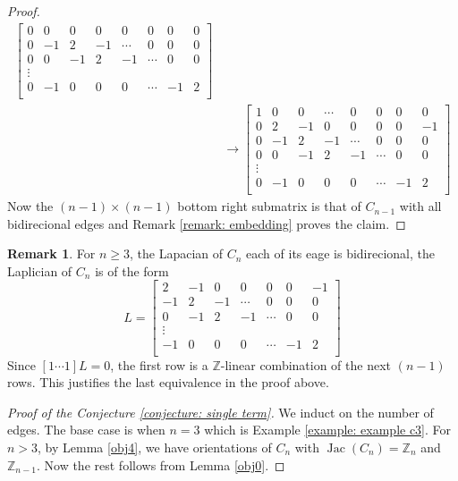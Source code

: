 \documentclass[11pt,reqno]{amsart}
\DeclareMathOperator{\Jac}{Jac}
\newcommand{\Z}{\mathbb{Z}}
\theoremstyle{definition}
\newtheorem{rmk}[mydef]{Remark}
\theoremstyle{plain}
\begin{document}
\begin{proof}
\begin{align*}
\begin{bmatrix}
				0 & 0 & 0 & 0 & 0 & 0 & 0 & 0   \\
				0 & -1 & 2 & -1 & \cdots & 0 & 0 & 0 \\
				0 & 0 & -1 & 2 & -1 & \cdots & 0 & 0  \\
				\vdots \\
				0 & -1 & 0 & 0 & 0 & \cdots & -1 & 2 \\
			\end{bmatrix}\\
			&\to\begin{bmatrix}
				1 & 0 & 0 & \cdots & 0 & 0 & 0 & 0 \\
				0 & 2 & -1 & 0 & 0 & 0 & 0 & -1   \\
				0 & -1 & 2 & -1 & \cdots & 0 & 0 & 0 \\
				0 & 0 & -1 & 2 & -1 & \cdots & 0 & 0  \\
				\vdots \\
				0 & -1 & 0 & 0 & 0 & \cdots & -1 & 2 \\
			\end{bmatrix} \tag{See the remark below for the last equivalance}
			\end{align*}
			Now the $(n-1) \times (n-1)$ bottom right submatrix is that of $C_{n-1}$ with all bidirecional edges and Remark \ref{remark: embedding} proves the claim.
		\end{proof}

		\begin{rmk} \label{obj2}
			For $n \ge 3$, the Lapacian of $C_n$ each of its eage is bidirecional, the Laplician of $C_n$ is of the form 
			$$
			L = 
			\begin{bmatrix}
				2 & -1 & 0 & 0 & 0 & 0 & -1   \\
				-1 & 2 & -1 & \cdots & 0 & 0 & 0 \\
				0 & -1 & 2 & -1 & \cdots & 0 & 0  \\
				\vdots \\
				-1 & 0 & 0 & 0 & \cdots & -1 & 2 \\
			\end{bmatrix}
			$$
			Since $[1 \cdots 1] L = 0$, 
			the first row is a $\Z$-linear combination of the next $(n-1)$ rows. 
			This justifies the last equivalence in the proof above.  
		\end{rmk}

		\begin{proof}[Proof of the Conjecture \ref{conjecture: single term}]
		We induct on the number of edges. The base case is when $n = 3$ which is Example \ref{example: example c3}. For $n > 3$, by Lemma \ref{obj4}, we have orientations of $C_n$ with $\Jac(C_n) = \mathbb{Z}_n$ and $\mathbb{Z}_{n-1}$. 
		Now the rest follows from Lemma \ref{obj0}. 
		\end{proof}
			
\end{document}

